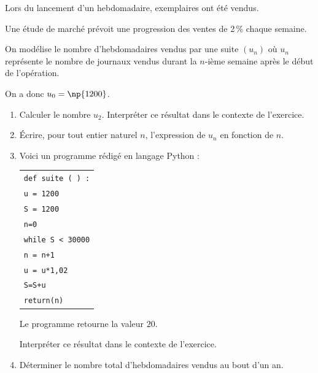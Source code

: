 \medskip

Lors du lancement d'un hebdomadaire,  exemplaires ont été vendus.

Une étude de marché prévoit une progression des ventes de 2\,\% chaque semaine.

On modélise le nombre d'hebdomadaires vendus par une suite $\left(u_n\right)$ où $u_n$ représente le nombre de journaux vendus durant la $n$-ième semaine après le début de l'opération.

On a donc $u_0 = \np{1200}$.

\medskip

\begin{enumerate}
\item Calculer le nombre $u_2$. Interpréter ce résultat dans le contexte de l'exercice. 
\item Écrire, pour tout entier naturel $n$, l'expression de $u_n$ en fonction de $n$.
\item Voici un programme rédigé en langage Python :

\begin{center}
\begin{tabularx}{0.45\linewidth}{|X|}\hline
\texttt{def suite ( ) :}\\
\quad \texttt{u = 1200} \\
\quad \texttt{S = 1200}\\
\quad \texttt{n=0}\\
\quad \texttt{while S < 30000}\\
\qquad \texttt{n = n+1}\\
\qquad  \texttt{u = u*1,02}\\
\qquad  \texttt{S=S+u}\\
\quad \texttt{return(n)}\\ \hline
\end{tabularx}
\end{center}

Le programme retourne la valeur $20$.

Interpréter ce résultat dans le contexte de l'exercice.
\item Déterminer le nombre total d'hebdomadaires vendus au bout d'un an.
\end{enumerate}

\bigskip
